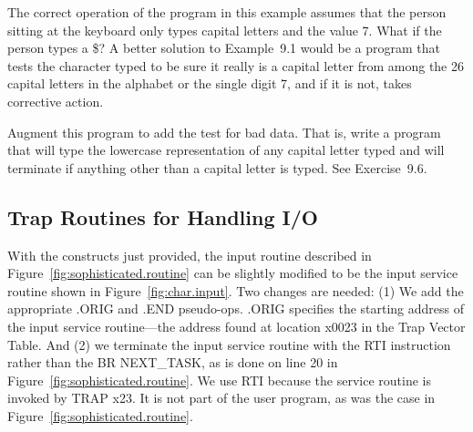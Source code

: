 \documentclass{patt}
\begin{document}
The correct operation of the program in this example assumes that the
person sitting at the keyboard only types capital letters and the
value 7.  What if the person types a \$?  A better solution to
Example~9.1 would be a program that tests the character typed to be
sure it really is a capital letter from among the 26 capital letters
in the alphabet or the single digit 7, and if it is not, takes corrective 
action.

 Augment this program to add the test for
bad data. That is, write a program that will type the lowercase
representation of any capital letter typed and will terminate if
anything other than a capital letter is typed. See Exercise~9.6.

\subsection{Trap Routines for Handling I/O}

 With the constructs just provided, the input routine described in
Figure~\ref{fig:sophisticated.routine} can be slightly modified to be
the input service routine shown in Figure~\ref{fig:char.input}. Two
changes are needed: (1) We add the appropriate .ORIG and .END
pseudo-ops.  .ORIG specifies the starting address of the input service
routine---the address found at location x0023 in the Trap Vector
Table.  And (2) we terminate the input service routine with the RTI
instruction rather than the BR NEXT\_TASK, as is
done on line 20 in Figure~\ref{fig:sophisticated.routine}. We use RTI
because the service routine is invoked by TRAP x23. It is not part
of the user program, as was the case in
Figure~\ref{fig:sophisticated.routine}.
\end{document}
